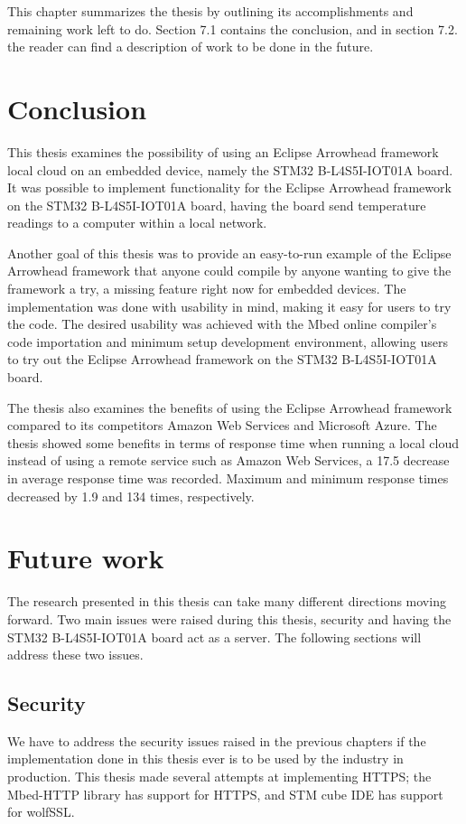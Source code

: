 This chapter summarizes the thesis by outlining its accomplishments and remaining work left to do.
Section 7.1 contains the conclusion, and in section 7.2. the reader can find a description of work to be done in the future.
\section{Conclusion}
This thesis examines the possibility of using an Eclipse Arrowhead framework local cloud on an embedded device, namely the STM32 B-L4S5I-IOT01A board. 
It was possible to implement functionality for the Eclipse Arrowhead framework on the STM32 B-L4S5I-IOT01A board, having the board send temperature readings to a computer within a local network.

Another goal of this thesis was to provide an easy-to-run example of the Eclipse Arrowhead framework that anyone could compile by anyone wanting to give the framework a try, a missing feature right now for embedded devices.
The implementation was done with usability in mind, making it easy for users to try the code.
The desired usability was achieved with the Mbed online compiler's code importation and minimum setup development environment, allowing users to try out the Eclipse Arrowhead framework on the STM32 B-L4S5I-IOT01A board.

The thesis also examines the benefits of using the Eclipse Arrowhead framework compared to its competitors Amazon Web Services and Microsoft Azure.
The thesis showed some benefits in terms of response time when running a local cloud instead of using a remote service such as Amazon Web Services, a 17.5 decrease in average response time was recorded.
Maximum and minimum response times decreased by 1.9 and 134 times, respectively.  

\section{Future work}
The research presented in this thesis can take many different directions moving forward.
Two main issues were raised during this thesis, security and having the STM32 B-L4S5I-IOT01A board act as a server.
The following sections will address these two issues.
\subsection{Security}
We have to address the security issues raised in the previous chapters if the implementation done in this thesis ever is to be used by the industry in production. 
This thesis made several attempts at implementing HTTPS; the Mbed-HTTP library has support for HTTPS, and STM cube IDE has support for wolfSSL. 

